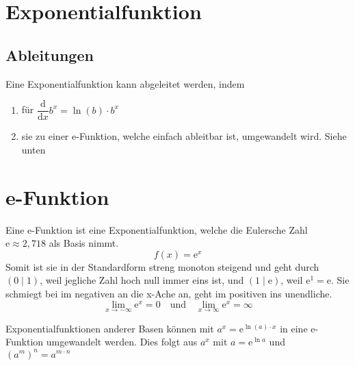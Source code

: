 \documentclass{article}
\begin{document}
  
\section{Exponentialfunktion}
\subsection{Ableitungen}
Eine Exponentialfunktion kann abgeleitet werden, indem
\begin{enumerate}
 \item für $\dfrac{\mathrm{d}}{\mathrm{d}x} b^x = \ln{(b)} \cdot b^x$
 \item sie zu einer e-Funktion, welche einfach ableitbar ist, umgewandelt wird. Siehe unten 
\end{enumerate} 
 
\section{e-Funktion}
 
\begin{minipage}{5cm} 
 \centering
\end{minipage}
\hfill
\begin{minipage}{\dimexpr\textwidth-5cm} 
Eine e-Funktion ist eine Exponentialfunktion, welche die Eulersche Zahl $\mathrm{e} \approx 2,718$ als Basis nimmt.
\[
 f(x)=\mathrm{e}^x
\]
Somit ist sie in der Standardform streng monoton steigend und geht durch ${(0 \mid 1)}$, weil jegliche Zahl hoch null immer eins ist, und $(1 \mid \mathrm{e})$, weil $\mathrm{e}^1=\mathrm{e}$. \newline
Sie schmiegt bei im negativen an die x-Ache an, geht im positiven ins unendliche.
\[
 \lim_{x \to -\infty} \mathrm{e}^x = 0
 \quad \text{und} \quad
 \lim_{x \to \infty} \mathrm{e}^x = \infty
\]
\end{minipage}
 
\vspace{1em} 
\noindent Exponentialfunktionen anderer Basen können mit $a^x = \mathrm{e}^{\ln{(a)} \cdot x}$ in eine e-Funktion umgewandelt werden. Dies folgt aus $a^x$ mit $a=\mathrm{e}^{\ln{a}}$ und $(a^m)^n = a^{m \cdot n}$ 
\end{document}
